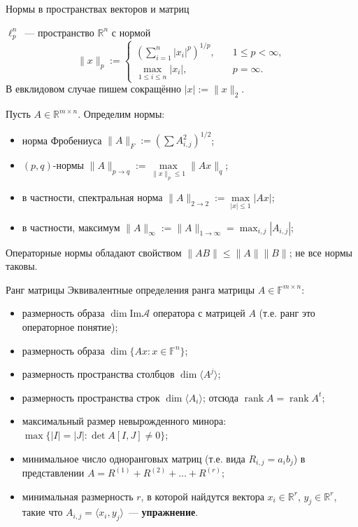 \documentclass[12pt,handout]{beamer}
\renewcommand\le{\leqslant}
\newcommand\R{\mathbb R}
\DeclareMathOperator{\rank}{rank}
\begin{document}
\begin{frame}{Нормы в пространствах векторов и матриц}

    $\ell_p^n$~--- пространство $\R^n$ с нормой
    $$
    \|x\|_p := \begin{cases}
        (\sum_{i=1}^n |x_i|^p)^{1/p},&\quad 1\le p<\infty,\\
        \max_{1\le i\le n}|x_i|,&\quad p=\infty.
    \end{cases}
    $$
    В евклидовом случае пишем сокращённо $|x|:=\|x\|_2$.

    Пусть $A\in\R^{m\times n}$. Определим нормы:
\begin{itemize}
    \item норма Фробениуса $\|A\|_F := (\sum A_{i,j}^2)^{1/2}$;
    \item $(p,q)$-нормы $\|A\|_{p\to q} := \max\limits_{\|x\|_p\le 1}\|Ax\|_q$;
    \item в частности, спектральная норма $\|A\|_{2\to2} := \max\limits_{|x|\le 1}
        |Ax|$;
    \item в частности, максимум $\|A\|_\infty := \|A\|_{1\to\infty} =
        \max_{i,j}|A_{i,j}|$;
\end{itemize}

Операторные нормы обладают свойством $\|AB\|\le \|A\|\|B\|$; не все нормы
таковы.

\end{frame}


\begin{frame}{Ранг матрицы}
    Эквивалентные определения ранга матрицы $A\in\mathbb{F}^{m\times n}$:
    \begin{itemize}
        \item размерность образа $\dim\mathrm{Im}\mathcal A$ оператора с
            матрицей $A$ (т.е. ранг это операторное понятие);
        \item размерность образа $\dim\{Ax\colon x\in\mathbb F^n\}$;
        \item размерность пространства столбцов $\dim\langle A^j\rangle$;
        \item размерность пространства строк $\dim\langle A_i\rangle$; отсюда
            $\rank A=\rank A^t$;
        \item максимальный размер невырожденного минора:
            $\max\{|I|=|J|\colon \det A[I,J]\ne 0\}$;
        \item минимальное число одноранговых матриц (т.е. вида $R_{i,j}=a_ib_j$)
            в представлении $A=R^{(1)}+R^{(2)}+\ldots+R^{(r)}$;
        \item минимальная размерность $r$, в которой найдутся вектора
            $x_i\in\R^r$, $y_j\in\R^r$, такие что $A_{i,j}=\langle
            x_i,y_j\rangle$~--- \textbf{упражнение}.
    \end{itemize}

\end{frame}
\end{document}
